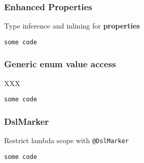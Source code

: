 
\begin{frame}[fragile] \frametitle{Enhanced Properties}
Type inference and inlining for \textbf{properties} %
\begin{lstlisting}
some code
\end{lstlisting}
\end{frame}


\begin{frame}[fragile] \frametitle{Generic enum value access}
XXX
\begin{lstlisting}
some code
\end{lstlisting}
\end{frame}


\begin{frame}[fragile] \frametitle{DslMarker}
Restrict lambda scope with \texttt{@DslMarker}
\begin{lstlisting}
some code
\end{lstlisting}
\end{frame}

